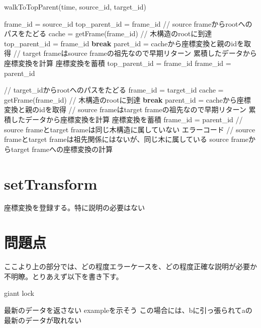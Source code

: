 \documentclass[a4paper]{jreport}	%
\begin{document}
\begin{algorithm}[H]
	\caption{walkToTopParent(time, source\_id, target\_id)}
	\begin{algorithmic}
	\STATE frame\_id = source\_id
	\STATE top\_parent\_id = frame\_id
	\STATE // source frameからrootへのパスをたどる
	\STATE cache = getFrame(frame\_id)
	\STATE // 木構造のrootに到達
	\STATE top\_parent\_id = frame\_id
	\STATE \textbf{break}
	\ENDIF
	\STATE paret\_id = cacheから座標変換と親のidを取得
	\STATE // target frameはsource frameの祖先なので早期リターン
	\STATE 累積したデータから座標変換を計算
	\ENDIF
	\STATE 座標変換を蓄積
	\STATE top\_parent\_id = frame\_id
	\STATE frame\_id = parent\_id
	\ENDWHILE
	
	\STATE // target\_idからrootへのパスをたどる
	\STATE frame\_id = target\_id
	\STATE cache = getFrame(frame\_id)
	\STATE // 木構造のrootに到達
	\STATE \textbf{break}
	\ENDIF
	\STATE parent\_id = cacheから座標変換と親のidを取得
	\STATE // source frameはtarget frameの祖先なので早期リターン
	\STATE 累積したデータから座標変換を計算
	\ENDIF
	\STATE 座標変換を蓄積
	\STATE frame\_id = parent\_id
	\ENDWHILE
	\STATE // source frameとtarget frameは同じ木構造に属していない
	\RETURN エラーコード
	\ENDIF
	\STATE // source frameとtarget frameは祖先関係にはないが、同じ木に属している
	\STATE source frameからtarget frameへの座標変換の計算
	\end{algorithmic}
\end{algorithm}




\section{setTransform}

座標変換を登録する。特に説明の必要はない


\section{問題点}

ここより上の部分では、どの程度エラーケースを、どの程度正確な説明が必要か不明瞭。とりあえず以下を書き下す。

giant lock

最新のデータを返さない
exampleを示そう
%
この場合には、bに引っ張られてaの最新のデータが取れない
\end{document}
